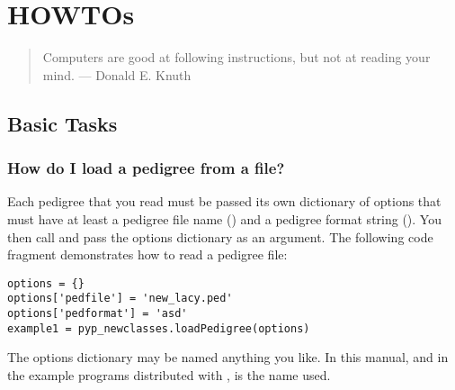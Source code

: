 \chapter{HOWTOs}
\label{cha:howtos}
\begin{quote}
Computers are good at following instructions, but not at reading your mind. --- Donald E. Knuth
\end{quote}
\section{Basic Tasks}
\label{sec:howto-basic-operations}

\subsection{How do I load a pedigree from a file?}
\label{sec:howto-load-pedigree}
Each pedigree that you read must be passed its own dictionary of options that must have at least a pedigree file name () and a pedigree format string ().  You then call  and pass the options dictionary as an argument.  The following code fragment demonstrates how to read a pedigree file:
\begin{verbatim}
options = {}
options['pedfile'] = 'new_lacy.ped'
options['pedformat'] = 'asd'
example1 = pyp_newclasses.loadPedigree(options)
\end{verbatim}
The options dictionary may be named anything you like.  In this manual, and in the example programs distributed with \PyPedal{},  is the name used.

